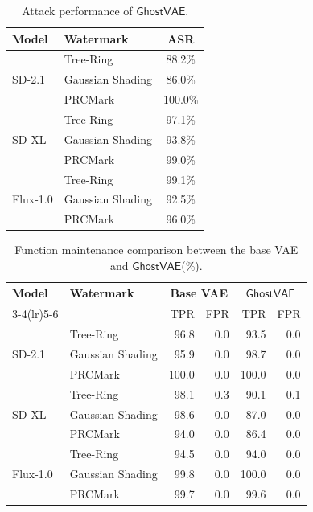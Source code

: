 \documentclass[letterpaper,twocolumn,10pt]{article}
\newcommand{\mg}{$\mathsf{GhostVAE}$\xspace}
\begin{document}
\begin{table}[t]
\centering
\caption{Attack performance of \mg.}
\label{tab:attack_results_asr_main}
\setlength{\tabcolsep}{14pt}
\begin{tabular}{llc}
\toprule
Model & Watermark & ASR \\
\midrule
\multirow{3}{*}{SD-2.1}
& Tree-Ring & 88.2\% \\
& Gaussian Shading      & 86.0\% \\
& PRCMark     & 100.0\%  \\
\midrule
\multirow{3}{*}{SD-XL}
& Tree-Ring & 97.1\% \\
& Gaussian Shading      & 93.8\% \\
& PRCMark    & 99.0\% \\

\midrule
\multirow{3}{*}{Flux-1.0}
& Tree-Ring & 99.1\% \\
& Gaussian Shading      & 92.5\% \\
& PRCMark   & 96.0\% \\

\bottomrule
\end{tabular}
\end{table}

\begin{table}[t]
\centering
\caption{Function maintenance comparison between the base VAE and \mg (\%).}
\label{tab:attack_results_tpr_fpr_main}
\setlength{\tabcolsep}{4pt}
\begin{tabular}{ll rr rr}
\toprule
\multirow{2}{*}{Model} & \multirow{2}{*}{Watermark} &
\multicolumn{2}{c}{Base VAE} &
\multicolumn{2}{c}{\mg} \\
\cmidrule(lr){3-4}\cmidrule(lr){5-6}
& & TPR & FPR & TPR & FPR \\
\midrule
\multirow{3}{*}{SD-2.1}
& Tree-Ring       & 96.8 & 0.0 & 93.5  & 0.0 \\
& Gaussian Shading & 95.9 & 0.0 & 98.7  & 0.0 \\
& PRCMark         & 100.0 & 0.0 & 100.0 & 0.0 \\
\midrule
\multirow{3}{*}{SD-XL}
& Tree-Ring       & 98.1 & 0.3 & 90.1  & 0.1 \\
& Gaussian Shading & 98.6 & 0.0 & 87.0  & 0.0 \\
& PRCMark         & 94.0 & 0.0 & 86.4  & 0.0 \\
\midrule
\multirow{3}{*}{Flux-1.0}
& Tree-Ring       & 94.5 & 0.0 & 94.0  & 0.0 \\
& Gaussian Shading & 99.8 & 0.0 & 100.0 & 0.0 \\
& PRCMark         & 99.7 & 0.0 & 99.6  & 0.0 \\
\bottomrule
\end{tabular}
\end{table}
\end{document}
